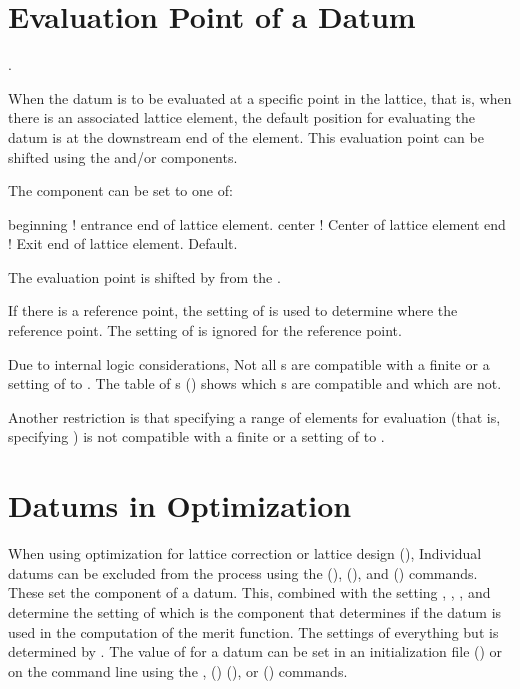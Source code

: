 \section{Evaluation Point of a Datum}.
\label{s:dat.eval}

When the datum is to be evaluated at a specific point in the lattice, that is, when there
is an associated lattice element, the default position for evaluating the datum is at the
downstream end of the element. This evaluation point can be shifted using the
 and/or  components. 

The  component can be set to one of:
\begin{example}
  beginning   ! entrance end of lattice element.
  center      ! Center of lattice element
  end         ! Exit end of lattice element. Default.
\end{example}
The evaluation point is shifted by  from the .

If there is a reference point, the setting of  is used to determine where
the reference point. The setting of  is ignored for the reference point.

Due to internal logic considerations, Not all s are compatible with a finite
 or a setting of  to . The table of s
() shows which s are compatible and which are not.

Another restriction is that specifying a range of elements for evaluation (that is,
specifying  ) is not compatible with a finite
 or a setting of  to .

\section{Datums in Optimization}
\label{s:datum.opt}

When using optimization for lattice correction or lattice design (), Individual datums
can be excluded from the process using the  (), 
(), and  () commands. These set the  component of
a datum. This, combined with the setting , , , and
 determine the setting of  which is the component that determines if the
datum is used in the computation of the merit function. The settings of everything but
 is determined by \tao. The value of  for a datum can be set in an
initialization file () or on the command line using the , ()
 (), or  () commands.

